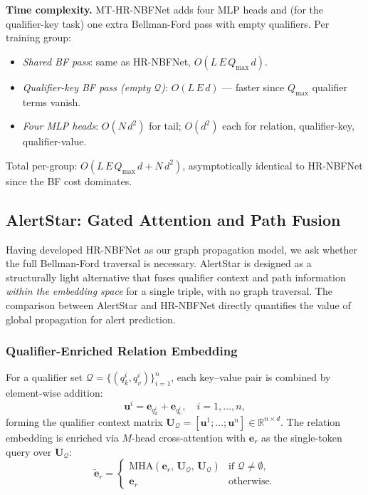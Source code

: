 \documentclass[10pt,journal,compsoc]{IEEEtran}
\begin{document}
\noindent\textbf{Time complexity.}
MT-HR-NBFNet adds four MLP heads and (for the qualifier-key
task) one extra Bellman-Ford pass with empty qualifiers.
Per training group:
\begin{itemize}
  \item \emph{Shared BF pass}: same as HR-NBFNet,
    $O(L\,E\,Q_{\max}\,d)$.
  \item \emph{Qualifier-key BF pass (empty $\mathcal{Q}$)}:
    $O(L\,E\,d)$ — faster since $Q_{\max}$ qualifier
    terms vanish.
  \item \emph{Four MLP heads}: $O(N\,d^2)$ for tail;
    $O(d^2)$ each for relation, qualifier-key, qualifier-value.
\end{itemize}
Total per-group: $O(L\,E\,Q_{\max}\,d + N\,d^2)$,
asymptotically identical to HR-NBFNet since the BF cost
dominates.

\subsection{AlertStar: Gated Attention and Path Fusion}
\label{ssec:alertstar}

Having developed HR-NBFNet as our graph propagation model,
we ask whether the full Bellman-Ford traversal is necessary.
AlertStar is designed as a structurally light alternative
that fuses qualifier context and path information
\emph{within the embedding space} for a single triple,
with no graph traversal.
The comparison between AlertStar and HR-NBFNet directly
quantifies the value of global propagation for alert prediction.

\subsubsection{Qualifier-Enriched Relation Embedding}
\label{sssec:as_qual}

For a qualifier set
$\mathcal{Q} = \{(q_k^i, q_v^i)\}_{i=1}^n$,
each key--value pair is combined by element-wise addition:
\begin{equation}
  \mathbf{u}^i
  = \mathbf{e}_{q_k^i} + \mathbf{e}_{q_v^i},
  \quad i = 1, \ldots, n,
  \label{eq:kv_add}
\end{equation}
forming the qualifier context matrix
$\mathbf{U}_{\mathcal{Q}}
 = [\mathbf{u}^1;\ldots;\mathbf{u}^n]
 \in \mathbb{R}^{n \times d}$.
The relation embedding is enriched via $M$-head
cross-attention with $\mathbf{e}_r$ as the single-token
query over $\mathbf{U}_{\mathcal{Q}}$:
\begin{equation}
  \tilde{\mathbf{e}}_r
  = \begin{cases}
      \mathrm{MHA}\!\left(
        \mathbf{e}_r,\,
        \mathbf{U}_{\mathcal{Q}},\,
        \mathbf{U}_{\mathcal{Q}}
      \right)
      & \text{if } \mathcal{Q} \neq \emptyset, \\[4pt]
      \mathbf{e}_r
      & \text{otherwise.}
    \end{cases}
  \label{eq:qual_enrich}
\end{equation}
\end{document}
